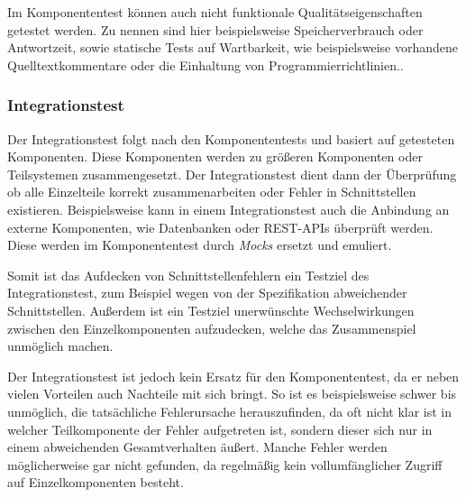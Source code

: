 Im Komponententest können auch nicht funktionale Qualitätseigenschaften getestet werden. Zu nennen sind hier beispielsweise Speicherverbrauch oder Antwortzeit, sowie statische Tests auf Wartbarkeit, wie beispielsweise vorhandene Quelltextkommentare oder die Einhaltung von Programmierrichtlinien.\cite[][49\psq]{spillner}.

\subsubsection{Integrationstest}
Der Integrationstest folgt nach den Komponententests und basiert auf getesteten Komponenten. Diese Komponenten werden zu größeren Komponenten oder Teilsystemen zusammengesetzt. Der Integrationstest dient dann der Überprüfung ob alle Einzelteile korrekt zusammenarbeiten oder Fehler in Schnittstellen existieren. \cite[][52\psq]{spillner} Beispielsweise kann in einem Integrationstest auch die Anbindung an externe Komponenten, wie Datenbanken oder REST-APIs überprüft werden. Diese werden im Komponententest durch \textit{Mocks} ersetzt und emuliert.

Somit ist das Aufdecken von Schnittstellenfehlern ein Testziel des Integrationstest, zum Beispiel wegen von der Spezifikation abweichender Schnittstellen. Außerdem ist ein Testziel unerwünschte Wechselwirkungen zwischen den Einzelkomponenten aufzudecken, welche das Zusammenspiel unmöglich machen. \cite[][56]{spillner}

Der Integrationstest ist jedoch kein Ersatz für den Komponententest, da er neben vielen Vorteilen auch Nachteile mit sich bringt. So ist es beispielsweise schwer bis unmöglich, die tatsächliche Fehlerursache herauszufinden, da oft nicht klar ist in welcher Teilkomponente der Fehler aufgetreten ist, sondern dieser sich nur in einem abweichenden Gesamtverhalten äußert. Manche Fehler werden möglicherweise gar nicht gefunden, da regelmäßig kein vollumfänglicher Zugriff auf Einzelkomponenten besteht.\cite[][57]{spillner}

